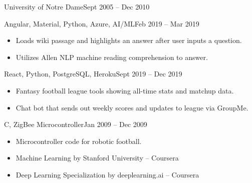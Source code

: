  {University of Notre Dame}{Sept 2005 -- Dec 2010 \hspace{1 cm}}{}

\smallskip
{}

\smallskip
{}
{Angular, Material, Python, Azure, AI/ML}{Feb 2019 -- Mar 2019}{}
\begin{itemize}
\item Loads wiki passage and highlights an answer after user inputs a question.
\item Utilizes Allen NLP machine reading comprehension to answer.
\end{itemize}

\divider

{React, Python, PostgreSQL, Heroku}{Sept 2019 -- Dec 2019}{}
\begin{itemize}
\item  Fantasy football league tools showing all-time stats and matchup data.
\item  Chat bot that sends out weekly scores and updates to league via GroupMe.
\end{itemize}

\divider

{C, ZigBee Microcontroller}{Jan 2009 -- Dec 2009}{}
\begin{itemize}
\item  Microcontroller code for robotic football.
\end{itemize}




\begin{itemize}
    \item Machine Learning by Stanford University -- Coursera
    \item Deep Learning Specialization by deeplearning.ai -- Coursera
\end{itemize}
